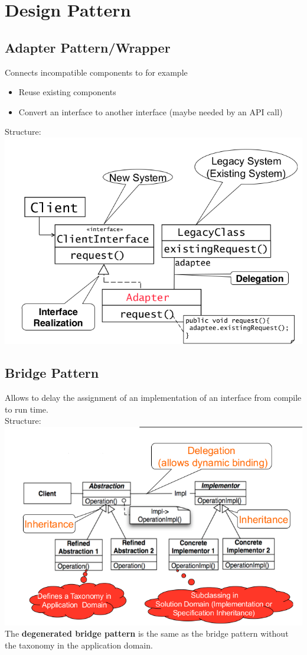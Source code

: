
\section{Design Pattern}

\subsection{Adapter Pattern/Wrapper}
Connects incompatible components to for example
\begin{itemize}
  \item Reuse existing components
  \item Convert an interface to another interface (maybe needed by an API call)
\end{itemize}

Structure:\\
\includegraphics[width=\linewidth]{design_pattern/adapter.png}


\subsection{Bridge Pattern}
Allows to delay the assignment of an implementation of an interface from compile to run time.\\
Structure: \\
\includegraphics[width=\linewidth]{design_pattern/bridge.png}
The \textbf{degenerated bridge pattern} is the same as the bridge pattern without the taxonomy in the application domain.


